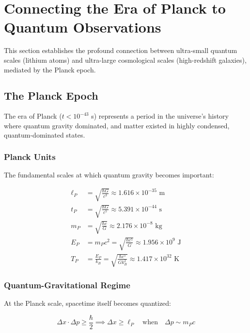 \section{Connecting the Era of Planck to Quantum Observations}
\label{sec:planck_era}

This section establishes the profound connection between ultra-small quantum scales (lithium atoms) and ultra-large cosmological scales (high-redshift galaxies), mediated by the Planck epoch.

\subsection{The Planck Epoch}
\label{subsec:planck_epoch}

The era of Planck ($t < 10^{-43}$ s) represents a period in the universe's history where quantum gravity dominated, and matter existed in highly condensed, quantum-dominated states.

\subsubsection{Planck Units}

The fundamental scales at which quantum gravity becomes important:

\begin{align}
\label{eq:planck_length}
\ell_P &= \sqrt{\frac{\hbar G}{c^3}} \approx 1.616 \times 10^{-35} \text{ m} \\
\label{eq:planck_time}
t_P &= \sqrt{\frac{\hbar G}{c^5}} \approx 5.391 \times 10^{-44} \text{ s} \\
\label{eq:planck_mass}
m_P &= \sqrt{\frac{\hbar c}{G}} \approx 2.176 \times 10^{-8} \text{ kg} \\
\label{eq:planck_energy}
E_P &= m_P c^2 = \sqrt{\frac{\hbar c^5}{G}} \approx 1.956 \times 10^9 \text{ J} \\
\label{eq:planck_temperature}
T_P &= \frac{E_P}{k_B} = \sqrt{\frac{\hbar c^5}{G k_B^2}} \approx 1.417 \times 10^{32} \text{ K}
\end{align}

\subsubsection{Quantum-Gravitational Regime}

At the Planck scale, spacetime itself becomes quantized:

\begin{equation}
\label{eq:quantum_spacetime}
\Delta x \cdot \Delta p \geq \frac{\hbar}{2} \implies \Delta x \geq \ell_P \quad \text{when} \quad \Delta p \sim m_P c
\end{equation}

